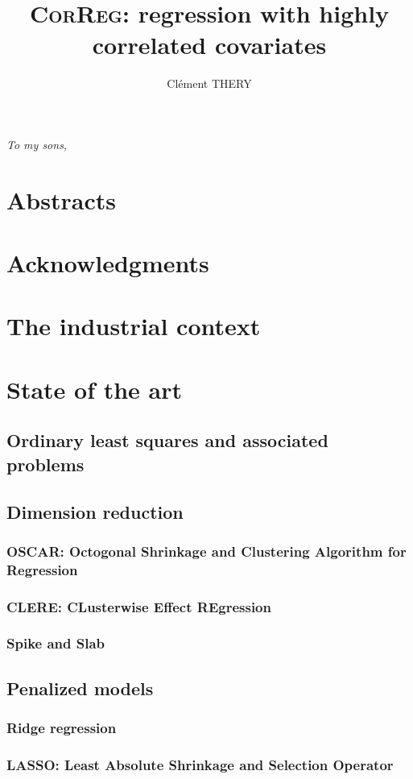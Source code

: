 \documentclass[11pt,a4paper]{report}
\author{Clément THERY}
\title{\textsc{CorReg}: regression with highly correlated covariates}
\begin{document}
\maketitle
\newpage
\itshape To my sons, \upshape
\tableofcontents
\chapter{Abstracts}
\chapter{Acknowledgments}
\chapter{The industrial context}
\chapter{State of the art}
	\section{Ordinary least squares and associated problems}
	\section{Dimension reduction}
		\subsection{OSCAR: Octogonal Shrinkage and Clustering Algorithm for Regression }
		\subsection{CLERE: CLusterwise Effect REgression}
		\subsection{Spike and Slab}	
	\section{Penalized models}
		\subsection{Ridge regression}
		\subsection{LASSO: Least Absolute Shrinkage and Selection Operator }
\end{document}
